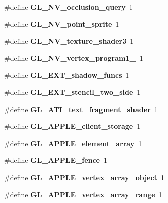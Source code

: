 \begin{DoxyCompactItemize}
\item 
\#define {\bfseries G\+L\+\_\+\+N\+V\+\_\+occlusion\+\_\+query}~1\label{_s_d_l__opengl_8h_a2ba03b49496dd6cb35150e4492ec162a}

\item 
\#define {\bfseries G\+L\+\_\+\+N\+V\+\_\+point\+\_\+sprite}~1\label{_s_d_l__opengl_8h_a645332a460a89939ae7034f3efb4dccc}

\item 
\#define {\bfseries G\+L\+\_\+\+N\+V\+\_\+texture\+\_\+shader3}~1\label{_s_d_l__opengl_8h_ae04906a37dc1fd35f50ffa0b99c39243}

\item 
\#define {\bfseries G\+L\+\_\+\+N\+V\+\_\+vertex\+\_\+program1\+\_}~1\label{_s_d_l__opengl_8h_a0052ad4aff6e88f423b21774890268a8}

\item 
\#define {\bfseries G\+L\+\_\+\+E\+X\+T\+\_\+shadow\+\_\+funcs}~1\label{_s_d_l__opengl_8h_a8bb417980938dbea3f0123c6369745fa}

\item 
\#define {\bfseries G\+L\+\_\+\+E\+X\+T\+\_\+stencil\+\_\+two\+\_\+side}~1\label{_s_d_l__opengl_8h_ade6db01171ace765e3a73a252484113e}

\item 
\#define {\bfseries G\+L\+\_\+\+A\+T\+I\+\_\+text\+\_\+fragment\+\_\+shader}~1\label{_s_d_l__opengl_8h_aaea8da937df0545fe4fce756eb2fcdea}

\item 
\#define {\bfseries G\+L\+\_\+\+A\+P\+P\+L\+E\+\_\+client\+\_\+storage}~1\label{_s_d_l__opengl_8h_a538c64bc7f6553ffde6c0fd413f125e9}

\item 
\#define {\bfseries G\+L\+\_\+\+A\+P\+P\+L\+E\+\_\+element\+\_\+array}~1\label{_s_d_l__opengl_8h_a830e342340eac5136a0e01bf7f5f2cb7}

\item 
\#define {\bfseries G\+L\+\_\+\+A\+P\+P\+L\+E\+\_\+fence}~1\label{_s_d_l__opengl_8h_af823eb13dc84ed95c3b6ae442759a326}

\item 
\#define {\bfseries G\+L\+\_\+\+A\+P\+P\+L\+E\+\_\+vertex\+\_\+array\+\_\+object}~1\label{_s_d_l__opengl_8h_a248583f177c2a0e16a69e6b3d15f8a09}

\item 
\#define {\bfseries G\+L\+\_\+\+A\+P\+P\+L\+E\+\_\+vertex\+\_\+array\+\_\+range}~1\label{_s_d_l__opengl_8h_ac35be51fc9690b30beb3fc37b36031bc}


\end{DoxyCompactItemize}
